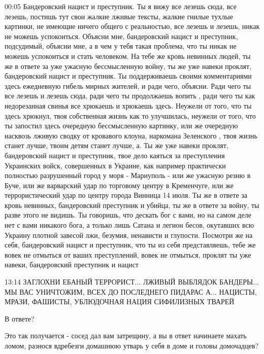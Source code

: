 00:05
Бандеровский нацист и преступник. Ты я вижу все лезешь сюда, все лезешь, постишь
тут свои жалкие лживые тексты, жалкие гнилые тухлые картинки, не имеющие ничего
общего с реальностью, все лезешь и лезешь, никак не можешь успокоиться. Объясни
мне, бандеровский нацист и преступник, подсудимый, объясни мне, а в чем у тебя
такая проблема, что ты никак не можешь успокоиться и стать человеком. На тебе
же кровь невинных людей, ты же в ответе за уже ужасную бессмысленную войну, ты
же уже навеки проклят, бандеровский нацист и преступник. Ты поддерживаешь своими
комментариями здесь ежедневную гибель мирных жителей, и ради чего, объясни.
Ради чего ты все лезешь и лезешь сюда, ради чего ты продолжаешь вопить , ради чего ты как недорезанная свинья все хрюкаешь
и хрюкаешь здесь. Неужели от того, что ты здесь хрюкнул, твоя собственная жизнь
как то улучшилась, неужели от того, что ты запостил здесь очередную
бессмысленную картинку, или же очередную насквозь лживую сводку от кровавого клоуна, наркомана
Зеленского , твоя жизнь станет лучше, твоим детям станет лучше, а. Ты же уже
навеки проклят, бандеровский нацист и преступник, твое дело каяться за преступления
Украинских войск, совершенных в Украине, как например практически полностью
разрушенный город у моря - Мариуполь - или же ужасную резню в Буче, или же
варварский удар по торговому центру в Кременчуге, или же террористический удар
по центру города Винница 14 июля. Ты же в
ответе за кровь невинных, бандеровский преступник и убийца, ты же в ответе за
войну, ты разве этого не видишь. Ты говоришь, что дескать бог с вами, но на
самом деле нет с вами никакого бога, а только лишь Сатана и легион бесов,
окутавших всю Украину плотной завесой лжи, безумия, ненависти и глупости.
Посмотри же на себя, бандеровский нацист и преступник, что ты из себя
представляешь, тебе же вовек не отмыться от ваших преступлений, вовек не
отмыться, проклят ты уже навеки, бандеровский преступник и нацист


13:14
ЗАГЛОХНИ ЕБАНЫЙ ТЕРРОРИСТ... ЛЖИВЫЙ ВЫБЛЯДОК БАНДЕРЫ... МЫ ВАС УНИЧТОЖИМ, ВСЕХ
ДО ПОСЛЕДНЕГО ПИДАРАС А... НАЦИСТЫ, МРАЗИ, ФАШИСТЫ, УБЛЮДОЧНАЯ НАЦИЯ СИФИЛИЗНЫХ
ТВАРЕЙ

В ответе?

Это так получается - сосед дал вам затрещину, а вы в ответ начинаете махать
ломом, разнося вдребезги домашнюю утварь у себя в доме и головы домочадцев?

